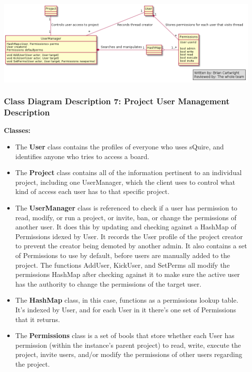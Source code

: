 \documentclass[twoside,letterpaper]{article}
\begin{document}
{\includegraphics[width=\textwidth]{images/ClassDiagrams/ProjectUserManagement}

\newpage

\subsubsection[Class Diagram Description 7: Project User Management Description]{\rmfamily\bfseries\color{black}
	Class Diagram Description 7: Project User Management Description}
\hypertarget{RefHeading22059017292}{}

\textbf{Classes:}
\begin{itemize}

	\item The \textbf{User} class contains the profiles of everyone who uses sQuire, and identifies anyone who tries to access a board.
	\item The \textbf{Project} class contains all of the information pertinent to an individual project, including one UserManager, which the client uses to control what kind of access each user has to that specific project.
	\item The \textbf{UserManager} class is referenced to check if a user has permission to read, modify, or run a project, or invite, ban, or change the permissions of another user. It does this by updating and checking against a HashMap of Permissions idexed by User. It records the User profile of the project creator to prevent the creator being demoted by another admin. It also contains a set of Permissions to use by default, before users are manually added to the project.
	The functions AddUser, KickUser, and SetPerms all modify the permissions HashMap after checking against it to make sure the active user has the authority to change the permissions of the target user.
	\item The \textbf{HashMap} class, in this case, functions as a permissions lookup table. It's indexed by User, and for each User in it there's one set of Permissions that it returns.
	\item The \textbf{Permissions} class is a set of bools that store whether each User has permission (within the instance's parent project) to read, write, execute the project, invite users, and/or modify the permissions of other users regarding the project.
\end{itemize}

}
\end{document}
